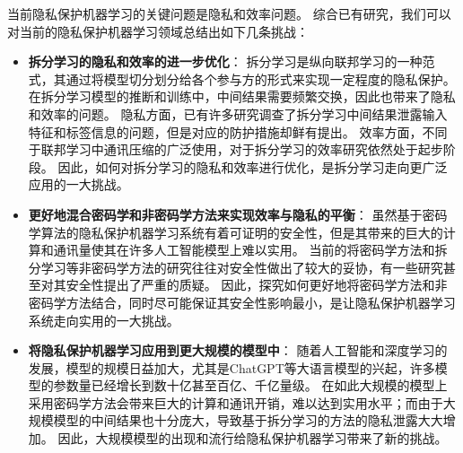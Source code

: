 当前隐私保护机器学习的关键问题是隐私和效率问题。
综合已有研究，我们可以对当前的隐私保护机器学习领域总结出如下几条挑战：
\begin{itemize}
    \item \textbf{拆分学习的隐私和效率的进一步优化}：
    拆分学习是纵向联邦学习的一种范式，其通过将模型切分划分给各个参与方的形式来实现一定程度的隐私保护。
    在拆分学习模型的推断和训练中，中间结果需要频繁交换，因此也带来了隐私和效率的问题。
    隐私方面，已有许多研究调查了拆分学习中间结果泄露输入特征和标签信息的问题，但是对应的防护措施却鲜有提出。
    效率方面，不同于联邦学习中通讯压缩的广泛使用，对于拆分学习的效率研究依然处于起步阶段。
    因此，如何对拆分学习的隐私和效率进行优化，是拆分学习走向更广泛应用的一大挑战。

    \item \textbf{更好地混合密码学和非密码学方法来实现效率与隐私的平衡}：
    虽然基于密码学算法的隐私保护机器学习系统有着可证明的安全性，但是其带来的巨大的计算和通讯量使其在许多人工智能模型上难以实用。
    当前的将密码学方法和拆分学习等非密码学方法的研究往往对安全性做出了较大的妥协，有一些研究甚至对其安全性提出了严重的质疑。
    因此，探究如何更好地将密码学方法和非密码学方法结合，同时尽可能保证其安全性影响最小，是让隐私保护机器学习系统走向实用的一大挑战。

    \item \textbf{将隐私保护机器学习应用到更大规模的模型中}：
    随着人工智能和深度学习的发展，模型的规模日益加大，尤其是ChatGPT等大语言模型的兴起，许多模型的参数量已经增长到数十亿甚至百亿、千亿量级。
    在如此大规模的模型上采用密码学方法会带来巨大的计算和通讯开销，难以达到实用水平；而由于大规模模型的中间结果也十分庞大，导致基于拆分学习的方法的隐私泄露大大增加。
    因此，大规模模型的出现和流行给隐私保护机器学习带来了新的挑战。
\end{itemize}


